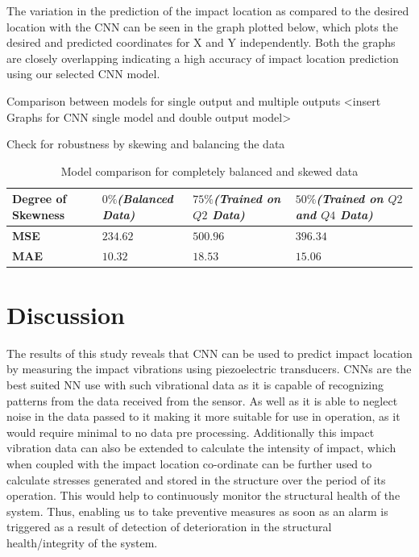 \documentclass[12pt]{article}
\begin{document}
The variation in the prediction of the impact location as compared to the desired location with the CNN can be seen in the graph plotted below, which plots the desired and predicted coordinates for X and Y independently. Both the graphs are closely overlapping indicating a high accuracy of impact location prediction using our selected CNN model.

Comparison between models for single output and multiple outputs
<insert Graphs for CNN single model and double output model>

Check for robustness by skewing and balancing the data
\begin{table}[H]
\centering
\begin{tabular}{|m{0.8 in}|m{1.5 in}|m{1.5 in}|m{1.5 in}|}
\hline
\textbf{Degree of Skewness} & \textbf{$0\%$\textit{(Balanced Data)}} & \textbf{$75\%$\textit{(Trained on $Q2$ Data)}} & \textbf{$50\%$\textit{(Trained on $Q2$ and $Q4$ Data)}}\\
\hline
\textbf{MSE} & $234.62$ & $500.96$ &$396.34$\\
\hline
\textbf{MAE} & $10.32$ & $18.53$ &$15.06$\\
\hline
\end{tabular}
\caption{Model comparison for completely balanced and skewed data}
\label{dataBalancing}
\end{table}

\section{Discussion}
The results of this study reveals that CNN can be used to predict impact location by measuring the impact vibrations using piezoelectric transducers. CNNs are the best suited NN use with such vibrational data as it is capable of recognizing patterns from the data received from the sensor. As well as it is able to neglect noise in the data passed to it making it more suitable for use in operation, as it would require minimal to no data pre processing. Additionally this impact vibration data can also be extended to calculate the intensity of impact, which when coupled with the impact location co-ordinate can be further used to calculate stresses generated and stored in the structure over the period of its operation. This would help to continuously monitor the structural health of the system. Thus, enabling us to take preventive measures as soon as an alarm is triggered as a result of detection of deterioration in the structural health/integrity of the system.   
\end{document}
